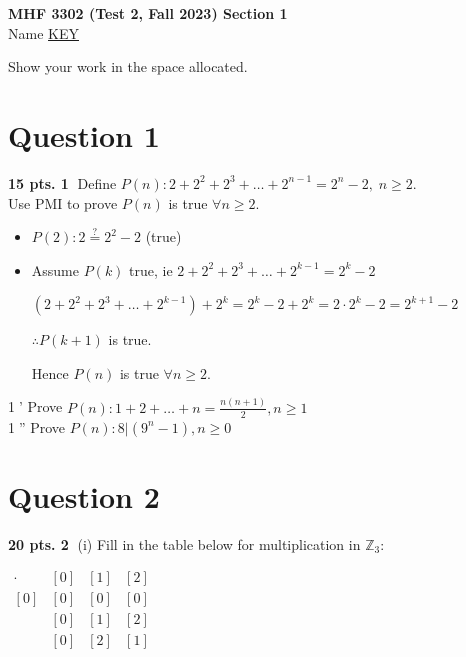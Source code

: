 \documentclass{article}
\begin{document}
\begin{center}
    \Large\textbf{MHF 3302 (Test 2, Fall 2023) Section 1} \\
    \vspace{0.2cm}
    \normalsize Name \underline{\hspace{3cm} KEY \hspace{3cm}}
\end{center}

\vspace{0.5cm}
\noindent Show your work in the space allocated.
\vspace{0.5cm}

\section*{Question 1}
\textbf{15 pts. \textcircled{1}} Define $P(n): 2 + 2^2 + 2^3 + \dots + 2^{n-1} = 2^n - 2, \; n \ge 2$. \\
Use PMI to prove $P(n)$ is true $\forall n \ge 2$.

\begin{itemize}
    \item[(i)] $P(2): 2 \overset{?}{=} 2^2 - 2$ (true)
    \item[(ii)] Assume $P(k)$ true, ie $2 + 2^2 + 2^3 + \dots + 2^{k-1} = 2^k - 2$
    
    $(2 + 2^2 + 2^3 + \dots + 2^{k-1}) + 2^k = 2^k - 2 + 2^k = 2 \cdot 2^k - 2 = 2^{k+1} - 2$
    
    $\therefore P(k+1)$ is true.
    
    Hence $P(n)$ is true $\forall n \ge 2$.
\end{itemize}

\vspace{0.3cm}
\noindent \textcircled{1}' Prove $P(n): 1+2+\dots+n = \frac{n(n+1)}{2}, n \ge 1$ \\
\noindent \textcircled{1}'' Prove $P(n): 8 | (9^n-1), n \ge 0$

\vspace{0.5cm}

\section*{Question 2}
\textbf{20 pts. \textcircled{2}} (i) Fill in the table below for multiplication in $\mathbb{Z}_3$:

\begin{center}
$
\begin{array}{c|ccc}
\cdot & [0] & [1] & [2] \\
\hline
[0] & [0] & [0] & [0] \\
[1] & [0] & [1] & [2] \\
[2] & [0] & [2] & [1]
\end{array}
$
\end{center}
\end{document}
